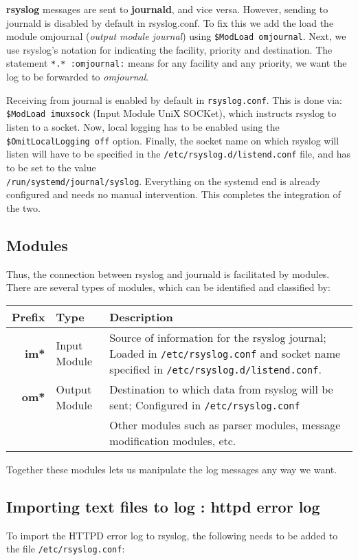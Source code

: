 \noindent
\textbf{rsyslog} messages are sent to \textbf{journald}, and vice versa. However, sending to journald is disabled by default in rsyslog.conf. To fix this we add the load the module omjournal (\textit{output module journal}) using \verb|$ModLoad omjournal|. Next, we use rsyslog's notation for indicating the facility, priority and destination. The statement \verb|*.* :omjournal:| means for any facility and any priority, we want the log to be forwarded to \textit{omjournal}. 

Receiving from journal is enabled by default in \verb|rsyslog.conf|. This is done via: \\\verb|$ModLoad imuxsock| (Input Module UniX SOCKet), which instructs rsyslog to listen to a socket. Now, local logging has to be enabled using the \verb|$OmitLocalLogging off| option. Finally, the socket name on which rsyslog will listen will have to be specified in the \verb|/etc/rsyslog.d/listend.conf| file, and has to be set to the value \\\verb|/run/systemd/journal/syslog|. Everything on the systemd end is already configured and needs no manual intervention. This completes the integration of the two. 

\subsection{Modules}
Thus, the connection between rsyslog and journald is facilitated by modules. There are several types of modules, which can be identified and classified by:

\noindent
\begin{tabular}{rlM{0.67}}
	\toprule
	\textbf{Prefix} &\textbf{Type} &\textbf{Description} \\
	\midrule
	\textbf{im*} &Input Module &Source of information for the rsyslog journal; Loaded in \verb|/etc/rsyslog.conf| and socket name specified in \verb|/etc/rsyslog.d/listend.conf|. \\
	\midrule
	\textbf{om*} &Output Module &Destination to which data from rsyslog will be sent; Configured in \verb|/etc/rsyslog.conf| \\
	\midrule
	&&Other modules such as parser modules, message modification modules, etc. \\
	\bottomrule
\end{tabular}

\noindent
Together these modules lets us manipulate the log messages any way we want. 

\subsection{Importing text files to log : httpd error log}
To import the HTTPD error log to rsyslog, the following needs to be added to the file \verb|/etc/rsyslog.conf|:

